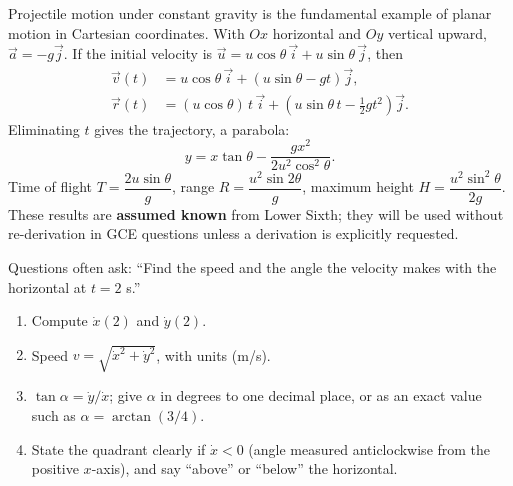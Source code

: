 \documentclass[11pt]{article}
\begin{document}
Projectile motion under constant gravity is the fundamental example of planar motion in Cartesian coordinates. With $Ox$ horizontal and $Oy$ vertical upward, $\vec{a} = -g\vec{j}$. If the initial velocity is $\vec{u} = u\cos\theta\,\vec{i} + u\sin\theta\,\vec{j}$, then
\begin{align*}
\vec{v}(t) &= u\cos\theta\,\vec{i} + (u\sin\theta - gt)\vec{j}, \\
\vec{r}(t) &= (u\cos\theta)\,t\,\vec{i} + \left(u\sin\theta\,t - \tfrac{1}{2}gt^2\right)\vec{j}.
\end{align*}
Eliminating $t$ gives the trajectory, a parabola:
\[
y = x\tan\theta - \frac{gx^2}{2u^2\cos^2\theta}.
\]
Time of flight $T = \dfrac{2u\sin\theta}{g}$, range $R = \dfrac{u^2\sin2\theta}{g}$, maximum height $H = \dfrac{u^2\sin^2\theta}{2g}$. These results are \textbf{assumed known} from Lower Sixth; they will be used without re-derivation in GCE questions unless a derivation is explicitly requested.

\begin{methode}
Questions often ask: ``Find the speed and the angle the velocity makes with the horizontal at $t = 2$ s.''
\begin{enumerate}
\item Compute $\dot{x}(2)$ and $\dot{y}(2)$.
\item Speed $v = \sqrt{\dot{x}^2 + \dot{y}^2}$, with units (m/s).
\item $\tan\alpha = \dot{y}/\dot{x}$; give $\alpha$ in degrees to one decimal place, or as an exact value such as $\alpha = \arctan(3/4)$.
\item State the quadrant clearly if $\dot{x}<0$ (angle measured anticlockwise from the positive $x$-axis), and say ``above'' or ``below'' the horizontal.
\end{enumerate}
\end{methode}
\end{document}
